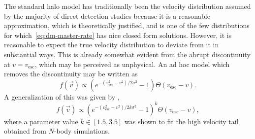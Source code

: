 The standard halo model has traditionally been the velocity distribution assumed by the majority of direct detection studies because it is a reasonable approximation, which is theoretically justified, and is one of the few distributions for which~\eqref{eq:dm-master-rate} has nice closed form solutions. However, it is reasonable to expect the true velocity distribution to deviate from it in substantial ways. This is already somewhat evident from the abrupt discontinuity at $v=v_\text{esc}$, which may be perceived as unphysical. An ad hoc model which removes the discontinuity may be written as
\begin{equation}
    f(\vec{v})\propto(e^{-(v_\text{esc}^2-v^2)/2\sigma^2}-1)\Theta(v_\text{esc}-v).
\end{equation}
A generalization of this was given by \textcite{LisantiEtAl2011},
\begin{equation}
    f(\vec{v})\propto(e^{-(v_\text{esc}^2-v^2)/2k\sigma^2}-1)^k\Theta(v_\text{esc}-v),
\end{equation}
where a parameter value $k\in[1.5,3.5]$ was shown to fit the high velocity tail obtained from $N$-body simulations.

